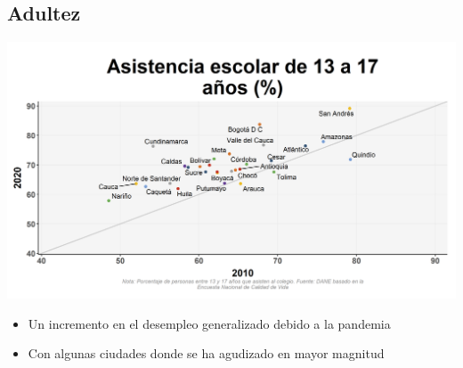 \documentclass[aspectratio=169]{beamer}
\begin{document}
    \subsection{Adultez}
    
    \begin{slide}{15} 
            \begin{imagecolumn}
                \includegraphics[width=\columnwidth]{img/var_87_scatter_time.png}
            \end{imagecolumn}
            \begin{textcolumn}
                \begin{itemize}
                    \item Un incremento en el desempleo generalizado debido a la pandemia
                    \item Con algunas ciudades donde se ha agudizado en mayor magnitud
                \end{itemize}
            \end{textcolumn}
    \printcolumns
    \end{slide}
    
\end{document}
